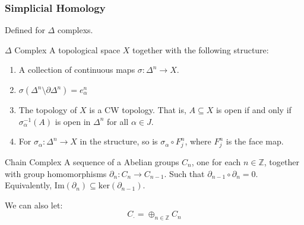 \documentclass{book}                                                           %
\begin{document}
                \subsubsection{Simplicial Homology}
                    Defined for $\Delta$ complexs.
                    \begin{ldefinition}{$\Delta$ Complex}
                        A topological space $X$ together with the
                        following structure:
                        \begin{enumerate}
                            \item A collection of continuous
                                  maps $\sigma:\Delta^{n}\rightarrow{X}$.
                            \item $\sigma(\Delta^{n}\setminus%
                                   \partial\Delta^{n})=e_{\alpha}^{n}$
                            \item The topology of $X$ is a CW topology.
                                  That is, $A\subseteq{X}$ is open
                                  if and only if
                                  $\sigma_{\alpha}^{\minus{1}}(A)$ is
                                  open in $\Delta^{n}$ for all
                                  $\alpha\in{J}$.
                            \item For $\sigma_{\alpha}:%
                                  \Delta^{n}\rightarrow{X}$ in the
                                  structure, so is
                                  $\sigma_{\alpha}\circ{F}_{j}^{n}$,
                                  where $F_{j}^{n}$ is the face map.
                        \end{enumerate}
                    \end{ldefinition}
                    \begin{ldefinition}{Chain Complex}
                        A sequence of a Abelian groups
                        $C_{n}$, one for each $n\in\mathbb{Z}$,
                        together with group homomorphisms
                        $\partial_{n}:C_{n}\rightarrow{C}_{n-1}$.
                        Such that $\partial_{n-1}\circ\partial_{n}=0$. 
                        Equivalently,
                        $\mathrm{Im}(\partial_{n})\subseteq%
                         \mathrm{ker}(\partial_{n-1})$.
                    \end{ldefinition}
                    We can also let:
                    \begin{equation}
                        C_{\cdot}=\oplus_{n\in\mathbb{Z}}C_{n}
                    \end{equation}
\end{document}
